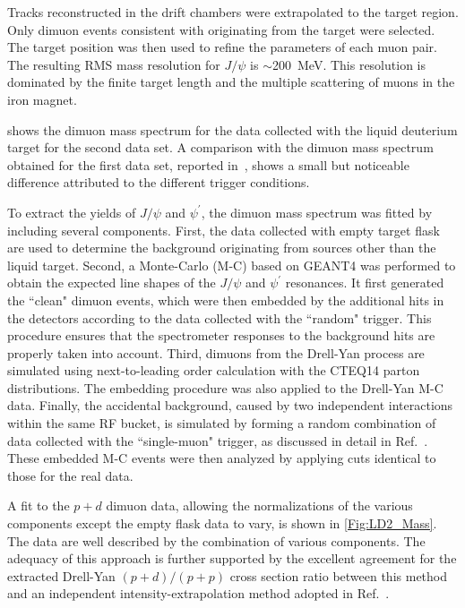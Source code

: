 \documentclass[reprint,aps,unsortedaddress,superscriptaddress,prl,floatfix,showpacs,linenumbers]{revtex4-2}
\begin{document}
Tracks reconstructed in the drift chambers were extrapolated
to the target region. Only dimuon events consistent with originating
from the target were selected. The target
position was then used to
refine the parameters of each muon pair. The resulting
RMS mass resolution for $J/\psi$ is $\sim$\SI{200}{\MeV}.
This resolution is dominated by the finite target length and the
multiple scattering of muons in the iron magnet.

 shows the dimuon mass spectrum for the data
collected with the
liquid deuterium target for the second data set. A comparison with the
dimuon mass spectrum obtained for the first data set,
reported in~\cite{dove2023}, shows
a small but noticeable difference attributed to the different
trigger conditions.

To extract the yields of $J/\psi$ and
$\psi^\prime$, the dimuon mass spectrum was fitted by
including several components. First, the
data collected with empty target flask
are used to determine the background originating from sources other than the
liquid target. Second, a Monte-Carlo (M-C) based on
GEANT4 was performed to obtain the expected line shapes of the $J/\psi$
and $\psi^\prime$ resonances. It first generated the ``clean"
dimuon events, which were then embedded by the additional hits in the detectors
according to the data collected with the ``random" trigger. This
procedure ensures that the spectrometer responses to the background hits
are properly taken into account.
Third, dimuons from the Drell-Yan process are simulated using
next-to-leading order
calculation with the CTEQ14 parton distributions.
The embedding procedure was also applied to the Drell-Yan M-C data.
Finally, the accidental background, caused by two independent
interactions within the same RF bucket, is simulated
by forming a random combination of data collected with the
``single-muon" trigger, as discussed in detail in Ref.~\cite{dove2023}.
These embedded M-C events were then analyzed by applying cuts identical
to those for the real data.

A fit to the $p+d$ dimuon data,
allowing the normalizations of
the various components except the empty flask data to vary, is
shown in \cref{Fig:LD2_Mass}.
The data are well described by the combination of various
components. The adequacy of this approach is further supported by the excellent
agreement for the extracted Drell-Yan $(p+d) / (p+p)$ cross section ratio
between this method~\cite{dove2023} and an independent intensity-extrapolation
method adopted in Ref.~\cite{dove2021}.
\end{document}
